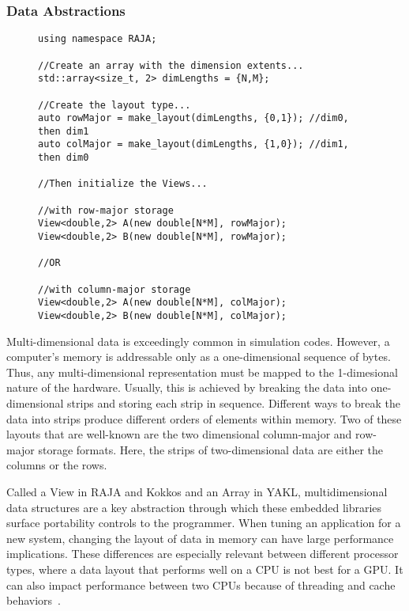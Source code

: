 \subsubsection{Data Abstractions}
\begin{figure}
\begin{lstlisting}[caption={Data declaration using RAJA multi-dimensional data abstractions, called Views. Changing a View's layout only requires changing the second argument in its constructor.}, label=stencilData]
using namespace RAJA;

//Create an array with the dimension extents...
std::array<size_t, 2> dimLengths = {N,M};

//Create the layout type...
auto rowMajor = make_layout(dimLengths, {0,1}); //dim0, then dim1
auto colMajor = make_layout(dimLengths, {1,0}); //dim1, then dim0

//Then initialize the Views...

//with row-major storage
View<double,2> A(new double[N*M], rowMajor);
View<double,2> B(new double[N*M], rowMajor);

//OR

//with column-major storage
View<double,2> A(new double[N*M], colMajor);
View<double,2> B(new double[N*M], colMajor);
\end{lstlisting}
\end{figure}

Multi-dimensional data is exceedingly common in simulation codes.
However, a computer's memory is addressable only as a one-dimensional sequence of bytes.
Thus, any multi-dimensional representation must be mapped to the 1-dimesional nature of the hardware.
Usually, this is achieved by breaking the data into one-dimensional strips and storing each strip in sequence.
Different ways to break the data into strips produce different orders of elements within memory.
Two of these layouts that are well-known are the two dimensional column-major and row-major storage formats.
Here, the strips of two-dimensional data are either the columns or the rows.

Called a View in RAJA and Kokkos and an Array in YAKL, multidimensional data structures are a key abstraction through which these embedded libraries surface portability controls to the programmer.
When tuning an application for a new system, changing the layout of data in memory can have large performance implications.
These differences are especially relevant between different processor types, where a data layout that performs well on a CPU is not best for a GPU.
It can also impact performance between two CPUs because of threading and cache behaviors~\cite{trott2021kokkos}.


